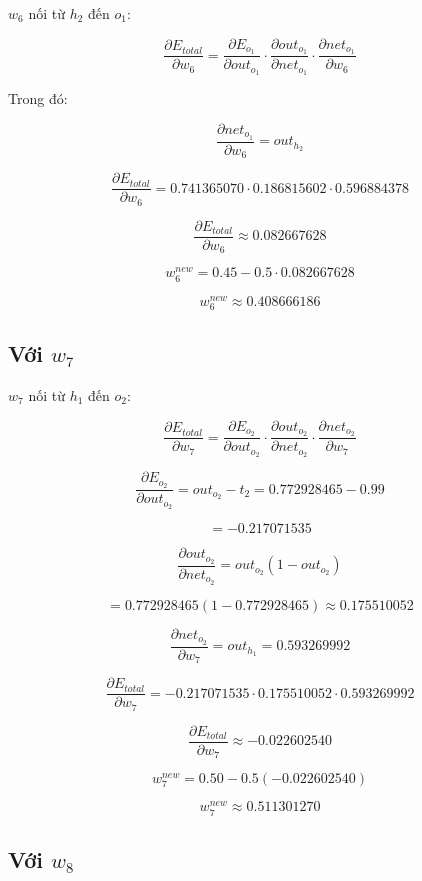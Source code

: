 \documentclass[12pt,a4paper]{report}
\begin{document}
$w_6$ nối từ $h_2$ đến $o_1$:

\[
    \frac{\partial E_{total}}{\partial w_6}
    =
    \frac{\partial E_{o_1}}{\partial out_{o_1}}
    \cdot
    \frac{\partial out_{o_1}}{\partial net_{o_1}}
    \cdot
    \frac{\partial net_{o_1}}{\partial w_6}
\]

Trong đó:

\[
    \frac{\partial net_{o_1}}{\partial w_6}=out_{h_2}
\]

\[
    \frac{\partial E_{total}}{\partial w_6}
    =
    0.741365070
    \cdot
    0.186815602
    \cdot
    0.596884378
\]

\[
    \frac{\partial E_{total}}{\partial w_6}
    \approx 0.082667628
\]

\[
    w_6^{new}
    =
    0.45
    -
    0.5\cdot 0.082667628
\]

\[
    w_6^{new}\approx 0.408666186
\]

\subsection*{Với $w_7$}

$w_7$ nối từ $h_1$ đến $o_2$:

\[
    \frac{\partial E_{total}}{\partial w_7}
    =
    \frac{\partial E_{o_2}}{\partial out_{o_2}}
    \cdot
    \frac{\partial out_{o_2}}{\partial net_{o_2}}
    \cdot
    \frac{\partial net_{o_2}}{\partial w_7}
\]

\[
    \frac{\partial E_{o_2}}{\partial out_{o_2}}
    =
    out_{o_2}-t_2
    =
    0.772928465-0.99
\]

\[
    =
    -0.217071535
\]

\[
    \frac{\partial out_{o_2}}{\partial net_{o_2}}
    =
    out_{o_2}(1-out_{o_2})
\]

\[
    =
    0.772928465(1-0.772928465)
    \approx 0.175510052
\]

\[
    \frac{\partial net_{o_2}}{\partial w_7}
    =
    out_{h_1}
    =
    0.593269992
\]

\[
    \frac{\partial E_{total}}{\partial w_7}
    =
    -0.217071535
    \cdot
    0.175510052
    \cdot
    0.593269992
\]

\[
    \frac{\partial E_{total}}{\partial w_7}
    \approx -0.022602540
\]

\[
    w_7^{new}
    =
    0.50
    -
    0.5(-0.022602540)
\]

\[
    w_7^{new}
    \approx 0.511301270
\]

\subsection*{Với $w_8$}
\end{document}
